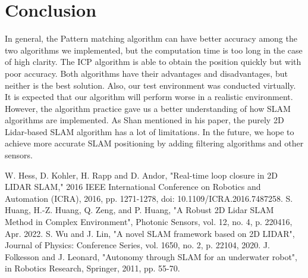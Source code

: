 \documentclass[conference]{IEEEtran}
\begin{document}
\section{Conclusion}
In general, the Pattern matching algorithm can have better accuracy among the two algorithms we implemented, but the computation time is too long in the case of high clarity. The ICP algorithm is able to obtain the position quickly but with poor accuracy. Both algorithms have their advantages and disadvantages, but neither is the best solution. Also, our test environment was conducted virtually. It is expected that our algorithm will perform worse in a realistic environment. However, the algorithm practice gave us a better understanding of how SLAM algorithms are implemented. As Shan mentioned in his paper, the purely 2D Lidar-based SLAM algorithm has a lot of limitations\cite{b2}. In the future, we hope to achieve more accurate SLAM positioning by adding filtering algorithms and other sensors.

\begin{thebibliography}{00}
 W. Hess, D. Kohler, H. Rapp and D. Andor, "Real-time loop closure in 2D LIDAR SLAM," 2016 IEEE International Conference on Robotics and Automation (ICRA), 2016, pp. 1271-1278, doi: 10.1109/ICRA.2016.7487258.
 S. Huang, H.-Z. Huang, Q. Zeng, and P. Huang, "A Robust 2D Lidar SLAM Method in Complex Environment", Photonic Sensors, vol. 12, no. 4, p. 220416, Apr. 2022.
 S. Wu and J. Lin, "A novel SLAM framework based on 2D LIDAR", Journal of Physics: Conference Series, vol. 1650, no. 2, p. 22104, 2020.
 J. Folkesson and J. Leonard, "Autonomy through SLAM for an underwater robot", in Robotics Research, Springer, 2011, pp. 55-70.
\end{thebibliography}
\vspace{12pt}
\end{document}
